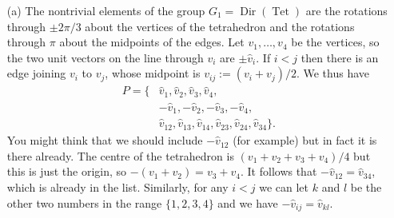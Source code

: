 \documentclass{amsart}
\DeclareMathOperator{\Tet}      {Tet}
\DeclareMathOperator{\Dir}      {Dir}
\newcommand{\vh}        {\hat{v}}
\renewcommand{\:}{\colon}
\theoremstyle{definition}
\begin{document}
\begin{itemize}
 \item[(a)] The nontrivial elements of the group $G_1=\Dir(\Tet)$ are
  the rotations through $\pm 2\pi/3$ about the vertices of the
  tetrahedron and the rotations through $\pi$ about the midpoints of
  the edges.  Let $v_1,\ldots,v_4$ be the vertices, so the two unit
  vectors on the line through $v_i$ are $\pm\vh_i$.  If $i<j$ then
  there is an edge joining $v_i$ to $v_j$, whose midpoint is
  $v_{ij}:=(v_i+v_j)/2$.  We thus have
  \begin{align*}
   P = \{ & \vh_1,\vh_2,\vh_3,\vh_4, \\
          & -\vh_1,-\vh_2,-\vh_3,-\vh_4,\\
          & \vh_{12},\vh_{13},\vh_{14},\vh_{23},\vh_{24},\vh_{34}\}.
  \end{align*}
  You might think that we should include $-\vh_{12}$ (for example) but
  in fact it is there already.  The centre of the tetrahedron is
  $(v_1+v_2+v_3+v_4)/4$ but this is just the origin, so
  $-(v_1+v_2)=v_3+v_4$.  It follows that $-\vh_{12}=\vh_{34}$, which
  is already in the list.  Similarly, for any $i<j$ we can let $k$ and
  $l$ be the other two numbers in the range $\{1,2,3,4\}$ and we have
  $-\vh_{ij}=\vh_{kl}$.


\end{itemize}
\end{document}
